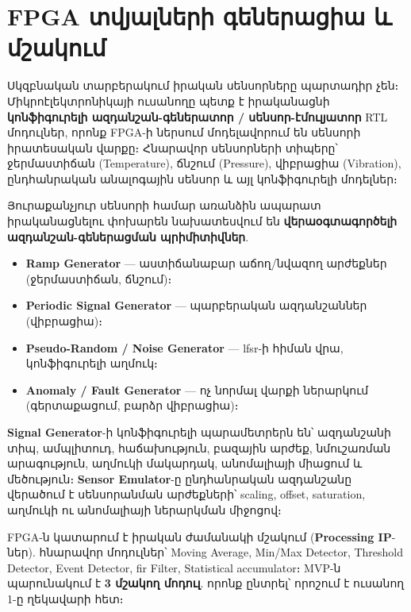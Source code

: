 \chapter{FPGA տվյալների գեներացիա և մշակում}
\label{ch:technical}

Սկզբնական տարբերակում իրական սենսորները պարտադիր չեն։ Միկրոէլեկտրոնիկայի
ուսանողը պետք է իրականացնի \textbf{կոնֆիգուրելի ազդանշան-գեներատոր / սենսոր-էմուլյատոր}
RTL մոդուլներ, որոնք FPGA-ի ներսում մոդելավորում են սենսորի իրատեսական վարքը։
Հնարավոր սենսորների տիպերը՝ ջերմաստիճան (Temperature), ճնշում (Pressure),
վիբրացիա (Vibration), ընդհանրական անալոգային սենսոր և այլ կոնֆիգուրելի մոդելներ։

Յուրաքանչյուր սենսորի համար առանձին ապարատ իրականացնելու փոխարեն նախատեսվում են
\textbf{վերաօգտագործելի ազդանշան-գեներացման պրիմիտիվներ}.
\begin{itemize}
  \item \textbf{Ramp Generator} — աստիճանաբար աճող/նվազող արժեքներ (ջերմաստիճան, ճնշում)։
  \item \textbf{Periodic Signal Generator} — պարբերական ազդանշաններ (վիբրացիա)։
  \item \textbf{Pseudo-Random / Noise Generator} — \gls{lfsr}-ի հիման վրա, կոնֆիգուրելի աղմուկ։
  \item \textbf{Anomaly / Fault Generator} — ոչ նորմալ վարքի ներարկում (գերտաքացում, բարձր վիբրացիա)։
\end{itemize}


\textbf{Signal Generator}-ի կոնֆիգուրելի պարամետրերն են՝ ազդանշանի տիպ, ամպլիտուդ,
հաճախություն, բազային արժեք, նմուշառման արագություն, աղմուկի մակարդակ, անոմալիայի
միացում և մեծություն։ \textbf{Sensor Emulator}-ը ընդհանրական ազդանշանը վերածում է
սենսորանման արժեքների՝ scaling, offset, saturation, աղմուկի ու անոմալիայի ներարկման միջոցով։

FPGA-ն կատարում է իրական ժամանակի մշակում (\textbf{Processing IP}-ներ). հնարավոր
մոդուլներ՝ Moving Average, Min/Max Detector, Threshold Detector, Event Detector,
\gls{fir} Filter, Statistical accumulator։ MVP-ն պարունակում է \textbf{3 մշակող մոդուլ}.
որոնք ընտրել՝ որոշում է ուսանող 1-ը ղեկավարի հետ։
